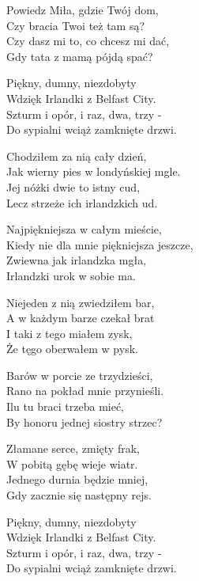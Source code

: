 \begin{text}
    Powiedz Miła, gdzie Twój dom,\\
    Czy bracia Twoi też tam są?\\
    Czy dasz mi to, co chcesz mi dać,\\
    Gdy tata z mamą pójdą spać?

    Piękny, dumny, niezdobyty\\
    Wdzięk Irlandki z Belfast City.\\
    Szturm i opór, i raz, dwa, trzy -\\
    Do sypialni wciąż zamknięte drzwi.

    Chodziłem za nią cały dzień,\\
    Jak wierny pies w londyńskiej mgle.\\
    Jej nóżki dwie to istny cud,\\
    Lecz strzeże ich irlandzkich ud.

    Najpiękniejsza w całym mieście,\\
    Kiedy nie dla mnie piękniejsza jeszcze,\\
    Zwiewna jak irlandzka mgła,\\
    Irlandzki urok w sobie ma.

    Niejeden z nią zwiedziłem bar,\\
    A w każdym barze czekał brat\\
    I taki z tego miałem zysk,\\
    Że tęgo oberwałem w pysk.

    Barów w porcie ze trzydzieści,\\
    Rano na pokład mnie przynieśli.\\
    Ilu tu braci trzeba mieć,\\
    By honoru jednej siostry strzec?

    Złamane serce, zmięty frak,\\
    W pobitą gębę wieje wiatr.\\
    Jednego durnia będzie mniej,\\
    Gdy zacznie się następny rejs.

    Piękny, dumny, niezdobyty\\
    Wdzięk Irlandki z Belfast City.\\
    Szturm i opór, i raz, dwa, trzy -\\
    Do sypialni wciąż zamknięte drzwi.
\end{text}
